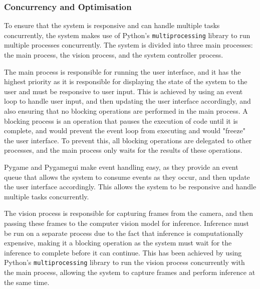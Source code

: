 \subsubsection{Concurrency and Optimisation}
\label{sec:concurrency}
To ensure that the system is responsive and can handle multiple tasks concurrently, the system makes use of Python's \texttt{multiprocessing} library to run multiple processes concurrently. The system is divided into three main processes: the main process, the vision process, and the system controller process.

The main process is responsible for running the user interface, and it has the highest priority as it is responsible for displaying the state of the system to the user and must be responsive to user input. This is achieved by using an event loop to handle user input, and then updating the user interface accordingly, and also ensuring that no blocking operations are performed in the main process. A blocking process is an operation that pauses the execution of code until it is complete, and would prevent the event loop from executing and would "freeze" the user interface. To prevent this, all blocking operations are delegated to other processes, and the main process only waits for the results of these operations.

Pygame \cite{pygamedoc} and Pygamegui \cite{pygamegui} make event handling easy, as they provide an event queue that allows the system to consume events as they occur, and then update the user interface accordingly. This allows the system to be responsive and handle multiple tasks concurrently. 

The vision process is responsible for capturing frames from the camera, and then passing these frames to the computer vision model for inference. Inference must be run on a separate process due to the fact that inference is computationally expensive, making it a blocking operation as the system must wait for the inference to complete before it can continue. This has been achieved by using Python's \texttt{multiprocessing} library to run the vision process concurrently with the main process, allowing the system to capture frames and perform inference at the same time.

